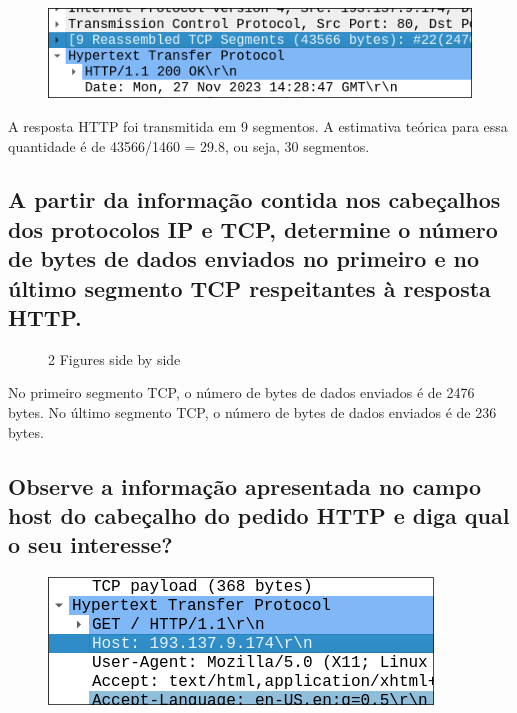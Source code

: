 \documentclass{article}
\begin{document}
\begin{figure}[h]
    \centering
    \includegraphics[width=0.5\linewidth]{images/segments.png}
\end{figure}

A resposta HTTP foi transmitida em 9 segmentos. A estimativa teórica para essa quantidade é de 43566/1460 = 29.8, ou seja, 30 segmentos.

\subsection{A partir da informação contida nos cabeçalhos dos protocolos IP e TCP, determine o número de bytes de
dados enviados no primeiro e no último segmento TCP respeitantes à resposta HTTP.}

\begin{figure}[h]
    \centering
    \qquad
    \caption{2 Figures side by side}%
    \label{fig:example}%
\end{figure}

No primeiro segmento TCP, o número de bytes de dados enviados é de 2476 bytes. No último segmento TCP, o número de bytes de dados enviados é de 236 bytes.

\subsection{Observe a informação apresentada no campo host do cabeçalho do pedido HTTP e diga qual o seu
interesse?}

\begin{figure}[h]
    \centering
    \includegraphics[width=0.5\linewidth]{images/host.png}
\end{figure}
\end{document}
